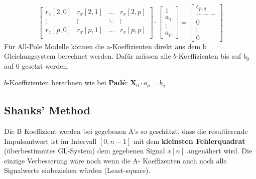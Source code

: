\begin{aufzaehlung}
$$\begin{bmatrix}
    		r_x[2,0] & r_x[2,1] & \hdots & r_x[2,p] \\
    		\vdots & \vdots & \ddots & \vdots \\                             
    		r_x[p,0] & r_x[p,1] & \hdots & r_x[p,p] \\                        
		\end{bmatrix} \cdot 
		\begin{bmatrix}
    		1 \\
    		a_1 \\
    		\vdots \\
    		a_p
		\end{bmatrix} = \begin{bmatrix}
    		\epsilon_{p,q} \\
    		---\\
    		0 \\
    		\vdots \\
    		0
		\end{bmatrix} $$ 
		Für All-Pole Modelle können die a-Koeffizienten direkt aus dem b Gleichungsystem berechnet werden. 
		Dafür müssen alle $b$-Koeffizienten bis auf $b_0$ auf 0 gesetzt werden.
	\item $b$-Koeffizienten berechnen wie bei \textbf{Padé}: $\bm X_0 \cdot a_p = b_q$ 
		\normalsize
\end{aufzaehlung}
	
\subsection{Shanks' Method }

Die B Koeffizient werden bei gegebenen A's so geschätzt, dass die resultierende Impulsantwort ist im Intervall $[0, n - 1]$ mit dem
\textbf{kleinsten Fehlerquadrat} (überbestimmtes GL-System) dem gegebenen
Signal $x[n]$ angenähert wird. Die einzige Verbesserung wäre noch wenn die A- Koeffizenten auch noch alle Signalwerte einbeziehen würden (Least-square).

